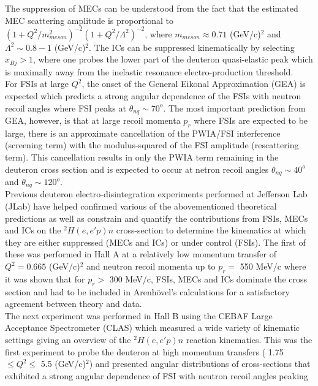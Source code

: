The suppression of MECs can be understood from the fact that the estimated MEC scattering amplitude is proportional to  $(1 + Q^{2}/m^{2}_{meson})^{-2}(1+Q^{2}/\Lambda^{2})^{-2}$, where $m_{meson}\approx0.71$ (GeV/c)$^{2}$ and
$\Lambda^{2}\sim 0.8-1 $ (GeV/c)$^{2}$\cite{Sargsian_2001}. The ICs can be suppressed kinematically by selecting $x_{Bj}>1$, where one probes the lower part of the deuteron quasi-elastic peak which is maximally away from the inelastic resonance
electro-production threshold. \\
\indent For FSIs at large $Q^{2}$, the onset of the General Eikonal Approximation (GEA)\cite{Sargsian_2001,PhysRevC.56.1124,sargsian_2015} is expected which predicts a strong angular dependence of the FSIs with neutron recoil angles where FSI peaks at $\theta_{nq}\sim70^{o}$. The
most important prediction from GEA, however, is that at large recoil momenta $p_{r}$ where FSIs are expected to be large, there is an approximate cancellation of the PWIA/FSI interference (screening term) with the
modulus-squared of the FSI amplitude (rescattering term). This cancellation results in only the PWIA term remaining in the deuteron cross section and is expected to occur at netron recoil angles $\theta_{nq}\sim40^{o}$ and $\theta_{nq}\sim120^{o}$. \\
\indent Previous deuteron electro-disintegration experiments performed at Jefferson Lab (JLab) have helped confirmed various of the abovementioned theoretical predictions as well as constrain and quantify the contributions from FSIs, MECs and ICs on
the $^{2}H(e,e'p)n$ cross-section to determine the kinematics at which they are either suppressed (MECs and ICs) or under control (FSIs). The first of these was performed in Hall A \cite{PhysRevLett.89.062301}
at a relatively low momentum transfer of $Q^{2}=0.665$ (GeV/c)$^{2}$ and neutron recoil momenta up to $p_{r} = $ 550 MeV/c where it was shown that for $p_{r}>$ 300 MeV/c, FSIs, MECs and ICs dominate the cross section and
had to be included in Arenh\"{o}vel's calculations \cite{PhysRevC.43.1022, PhysRevC.46.455, PhysRevC.52.1232, PhysRevC.55.2214} for a satisfactory agreement between theory and data. \\
\indent The next experiment was performed in Hall B \cite{PhysRevLett.98.262502} using the CEBAF Large Acceptance Spectrometer (CLAS) which measured a wide variety of kinematic settings
giving an overview of the $^{2}H(e,e'p)n$ reaction kinematics. This was the first experiment to probe
the deuteron at high momentum transfers ( 1.75 $\leq Q^{2}\leq$ 5.5 (GeV/c)$^{2}$) and presented angular distributions of cross-sections that exhibited a strong angular dependence of FSI with neutron recoil angles peaking
